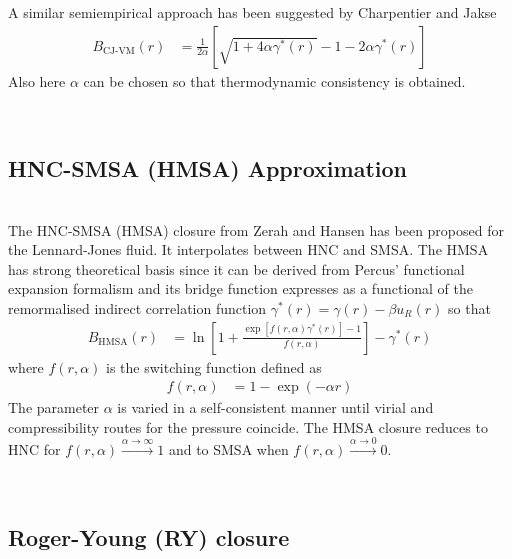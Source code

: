 A similar semiempirical approach has been suggested by Charpentier and Jakse
\cite{Charpentier2001}
\begin{align}
B_\text{CJ-VM}(r) &= \frac{1}{2\alpha}\left[\sqrt{1+4\alpha
\gamma^*(r)}-1-2\alpha\gamma^*(r) \right]
\end{align}
Also here $\alpha$ can be chosen so that thermodynamic consistency is obtained.




~\\
\subsection{HNC-SMSA (HMSA) Approximation}
~\\

The HNC\hbox{-}SMSA (HMSA) closure from Zerah and Hansen  \cite{Zerah1986} has been proposed
for the Lennard-Jones fluid. It interpolates between HNC and SMSA. The HMSA has
strong theoretical basis since it can be derived from Percus’ functional expansion
formalism and its bridge function expresses as a functional of the remormalised
indirect correlation function $\gamma^*(r)=\gamma(r)-\beta u_{R}(r)$ so that
\begin{align}
B_\text{HMSA}(r) &= \ln
\left[1+\frac{\exp\left[f(r,\alpha)\gamma^*(r)\right]-1}{f(r,\alpha)}\right]-\gamma^*(r)
\end{align}
where $f(r,\alpha)$ is the switching function defined as
\begin{align}
f(r,\alpha) &= 1-\exp(-\alpha r)
\end{align}
The parameter $\alpha$ is varied in a self-consistent manner until virial and
compressibility routes for the pressure coincide.
The HMSA closure reduces to HNC for $f(r,\alpha) \xrightarrow{\alpha\rightarrow\infty} 1$
and to SMSA when $f(r,\alpha) \xrightarrow{\alpha\rightarrow 0} 0$.

\vphantom{.}~\\
\subsection{Roger-Young (RY) closure}
~\\

